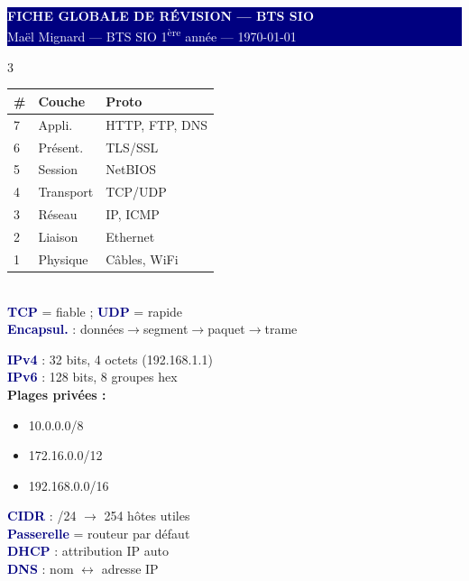 \documentclass[a4paper,9pt]{article}
\newcommand{\key}[1]{\textbf{\textcolor{navy}{#1}}}
\begin{document}
\begin{center}
  \colorbox{navy}{\parbox{\dimexpr\textwidth-2\fboxsep}{
    \centering\vspace{2pt}
    {\huge\bfseries\textcolor{white}{FICHE GLOBALE DE RÉVISION — BTS SIO}} \\
    {\large\textcolor{white}{Maël Mignard — BTS SIO 1\textsuperscript{ère} année — \today}}
    \vspace{2pt}
  }}
\end{center}
\vspace{4pt}

\begin{multicols}{3}

\begin{tcolorbox}[basebox, colframe=navy, title=RÉSEAUX — Modèle OSI]
{\footnotesize
\begin{tabularx}{\columnwidth}{@{}llX@{}}
\textbf{\#} & \textbf{Couche} & \textbf{Proto} \\
\hline
7 & Appli. & HTTP, FTP, DNS \\
6 & Présent. & TLS/SSL \\
5 & Session & NetBIOS \\
4 & Transport & TCP/UDP \\
3 & Réseau & IP, ICMP \\
2 & Liaison & Ethernet \\
1 & Physique & Câbles, WiFi \\
\end{tabularx}}
\vspace{2pt}\\
\key{TCP} = fiable ; \key{UDP} = rapide \\
\key{Encapsul.} : données$\to$segment$\to$paquet$\to$trame
\end{tcolorbox}

\begin{tcolorbox}[basebox, colframe=teal, title=RÉSEAUX — Adressage IP]
\key{IPv4} : 32 bits, 4 octets (192.168.1.1) \\
\key{IPv6} : 128 bits, 8 groupes hex \\[2pt]
\textbf{Plages privées :}
\begin{itemize}
  \item 10.0.0.0/8
  \item 172.16.0.0/12
  \item 192.168.0.0/16
\end{itemize}
\key{CIDR} : /24 $\to$ 254 hôtes utiles \\
\key{Passerelle} = routeur par défaut \\
\key{DHCP} : attribution IP auto \\
\key{DNS} : nom $\leftrightarrow$ adresse IP
\end{tcolorbox}


\end{multicols}
\end{document}
